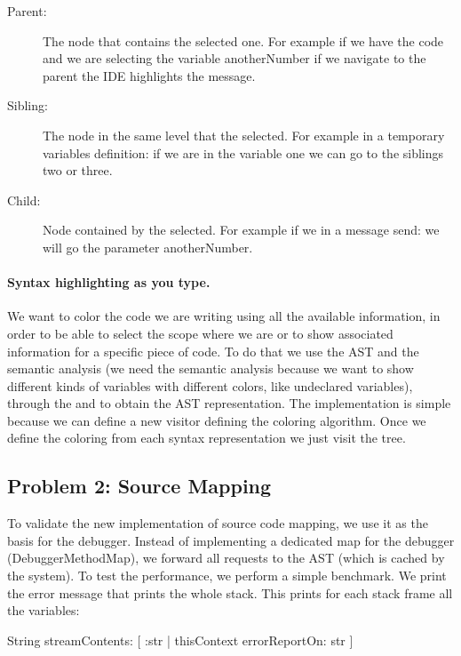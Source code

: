 \documentclass[preprint,10pt]{sigplanconf}
\begin{document}
\begin{description}		
\item[Parent:] The node that contains the selected one. For example if we have the code  and we are selecting the variable anotherNumber if we navigate to the parent the IDE highlights the message.
\item[Sibling:] The node in the same level that the selected. For example in a temporary variables definition:  if we are in the variable one we can go to the siblings two or three.
\item[Child:] Node contained by the selected. For example if we in a message send:  we will go the parameter anotherNumber.
\end{description}

\paragraph{Syntax highlighting as you type.} We want to color the code we are writing using all the available information, in order to be able to select the scope where we are or to show associated information for a specific piece of code. To do that we use the AST and the semantic analysis (we need the semantic analysis because we want to show different kinds of variables with different colors, like undeclared variables), through the  and  to obtain the AST representation. The implementation is simple because we can define a new visitor defining the coloring algorithm. Once we define the coloring from each syntax representation we just visit the tree.

\subsection{Problem 2: Source Mapping}
To validate the new implementation of source code mapping, we use it as the basis for the debugger. Instead of implementing a dedicated map for the debugger (DebuggerMethodMap), we forward all requests to the AST (which is cached by the system). To test the performance, we perform a simple benchmark.
We print the error message that prints the whole stack. This prints for each stack frame all the variables:

\begin{code}{}
String streamContents: [ :str | thisContext errorReportOn: str ]
\end{code}
\end{document}
